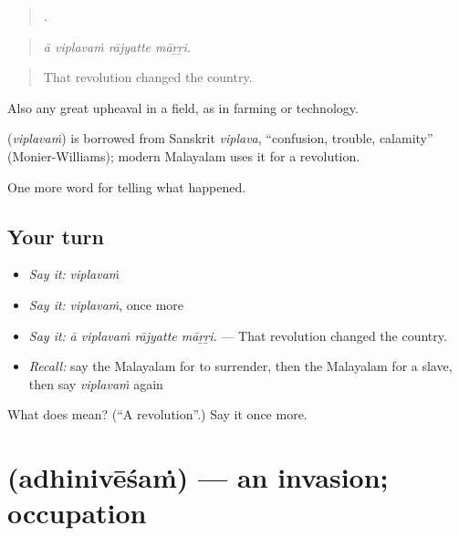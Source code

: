 \begin{quote}
   .
\end{quote}

\begin{quote}
\emph{ā viplavaṁ rājyatte māṟṟi.}
\end{quote}

\begin{quote}
That revolution changed the country.
\end{quote}

Also any great upheaval in a field, as in farming or technology.

\begin{cousinweb}
\textbf{} (\emph{viplavaṁ}) is borrowed from Sanskrit \emph{viplava}, \textquotedblleft{}confusion, trouble, calamity\textquotedblright{} (Monier-Williams); modern Malayalam uses it for a revolution.
\end{cousinweb}

\begin{grammarlens}[title={What you've built}]
One more word for telling what happened.
\end{grammarlens}

\subsection*{Your turn}
\begin{itemize}
\raggedright
  \item \emph{Say it:} \emph{viplavaṁ}
  \item \emph{Say it:} \emph{viplavaṁ}, once more
  \item \emph{Say it:} \emph{ā viplavaṁ rājyatte māṟṟi.} — That revolution changed the country.
  \item \emph{Recall:} say the Malayalam for to surrender, then the Malayalam for a slave, then say \emph{viplavaṁ} again
\end{itemize}

\begin{tcolorbox}[breakable,colback=teal!4,colframe=teal!35!black,title={Before you move on}]
What does  mean? (\textquotedblleft{}A revolution\textquotedblright{}.) Say it once more.
\end{tcolorbox}
\section[\texorpdfstring{\ml{അധിനിവേശം} (adhinivēśaṁ)}{അധിനിവേശം (adhinivēśaṁ)}]{ (adhinivēśaṁ) — an invasion; occupation}

